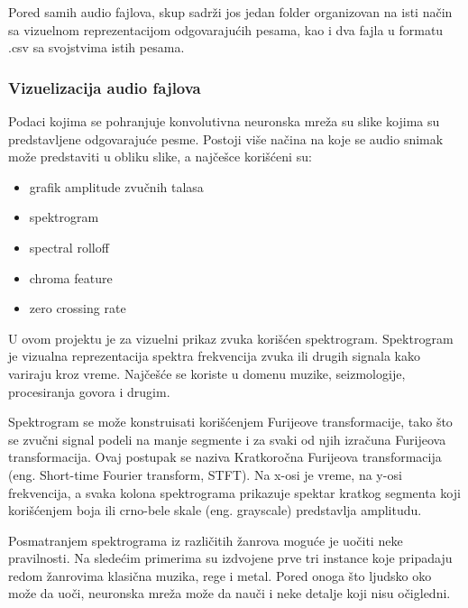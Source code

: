 \documentclass{article}
\begin{document}
Pored samih audio fajlova, skup sadrži jos jedan folder organizovan na isti način sa vizuelnom reprezentacijom odgovarajućih pesama, kao i dva fajla u formatu .csv sa svojstvima istih pesama.

\subsubsection{Vizuelizacija audio fajlova}
Podaci kojima se pohranjuje konvolutivna neuronska mreža su slike kojima su predstavljene odgovarajuće pesme. Postoji više načina na koje se audio snimak može predstaviti u obliku slike, a najčešce korišćeni su:
\begin{itemize}
    \item grafik amplitude zvučnih talasa
    \item spektrogram
    \item spectral rolloff
    \item chroma feature
    \item zero crossing rate
\end{itemize}

U ovom projektu je za vizuelni prikaz zvuka korišćen spektrogram. Spektrogram je vizualna reprezentacija spektra frekvencija zvuka ili drugih signala kako variraju kroz vreme. Najčešće se koriste u domenu muzike, seizmologije, procesiranja govora i drugim. 

Spektrogram se može konstruisati korišćenjem Furijeove transformacije, tako što se zvučni signal podeli na manje segmente i za svaki od njih izračuna Furijeova transformacija. Ovaj postupak se naziva Kratkoročna Furijeova transformacija (eng. Short-time Fourier transform, STFT). Na x-osi je vreme, na y-osi frekvencija, a svaka kolona spektrograma prikazuje spektar kratkog segmenta koji korišćenjem boja ili crno-bele skale (eng. grayscale) predstavlja amplitudu.

Posmatranjem spektrograma iz različitih žanrova moguće je uočiti neke pravilnosti. Na sledećim primerima su izdvojene prve tri instance koje pripadaju redom žanrovima klasična muzika, rege i metal. Pored onoga što ljudsko oko može da uoči, neuronska mreža može da nauči i neke detalje koji nisu očigledni.

\newpage
\end{document}
